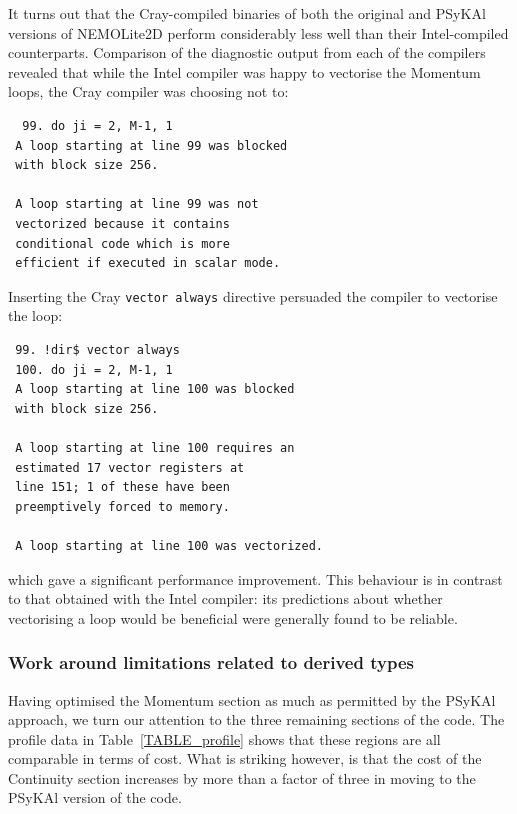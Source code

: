 \documentclass[gmdd, manuscript]{copernicus}
\begin{document}
It turns out that the Cray-compiled binaries of both the original and
{PS}y{KA}l versions of NEMOLite2D perform considerably less well than
their Intel-compiled counterparts. Comparison of the diagnostic output
from each of the compilers revealed that while the Intel compiler was
happy to vectorise the Momentum loops, the Cray compiler was choosing
not to:
\begin{verbatim}
  99. do ji = 2, M-1, 1
 A loop starting at line 99 was blocked 
 with block size 256.

 A loop starting at line 99 was not
 vectorized because it contains 
 conditional code which is more
 efficient if executed in scalar mode.
\end{verbatim}
Inserting the Cray \texttt{vector always} directive persuaded the compiler
to vectorise the loop:
\begin{verbatim}
 99. !dir$ vector always
 100. do ji = 2, M-1, 1
 A loop starting at line 100 was blocked
 with block size 256.

 A loop starting at line 100 requires an 
 estimated 17 vector registers at 
 line 151; 1 of these have been 
 preemptively forced to memory.

 A loop starting at line 100 was vectorized.
\end{verbatim}
which gave a significant performance improvement. This behaviour is in
contrast to that obtained with the Intel compiler: its predictions
about whether vectorising a loop would be beneficial were generally
found to be reliable.

\subsubsection{Work around limitations related to derived types}

Having optimised the Momentum section as much as permitted by the
{PS}y{KA}l approach, we turn our attention to the three remaining
sections of the code. The profile data in Table~\ref{TABLE_profile}
shows that these regions are all comparable in terms of cost. What is
striking however, is that the cost of the Continuity section increases
by more than a factor of three in moving to the {PS}y{KA}l version of the
code.
\end{document}
